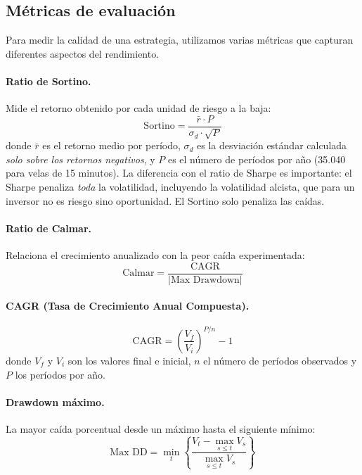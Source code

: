 \documentclass[12pt,a4paper]{article}
\begin{document}
\subsection{Métricas de evaluación}

Para medir la calidad de una estrategia, utilizamos varias métricas que capturan
diferentes aspectos del rendimiento.

\paragraph{Ratio de Sortino.} Mide el retorno obtenido por cada unidad de riesgo a
la baja:
\begin{equation}
\text{Sortino} = \frac{\bar{r} \cdot P}{\sigma_d \cdot \sqrt{P}}
\label{eq:sortino}
\end{equation}
donde $\bar{r}$ es el retorno medio por período, $\sigma_d$ es la desviación estándar
calculada \textit{solo sobre los retornos negativos}, y $P$ es el número de períodos
por año (35.040 para velas de 15 minutos). La diferencia con el ratio de Sharpe
 es importante: el Sharpe penaliza \textit{toda} la
volatilidad, incluyendo la volatilidad alcista, que para un inversor no es riesgo
sino oportunidad. El Sortino solo penaliza las caídas.

\paragraph{Ratio de Calmar.} Relaciona el crecimiento anualizado con la peor caída
experimentada:
\begin{equation}
\text{Calmar} = \frac{\text{CAGR}}{|\text{Max Drawdown}|}
\label{eq:calmar}
\end{equation}

\paragraph{CAGR (Tasa de Crecimiento Anual Compuesta).}
\begin{equation}
\text{CAGR} = \left(\frac{V_f}{V_i}\right)^{P/n} - 1
\label{eq:cagr}
\end{equation}
donde $V_f$ y $V_i$ son los valores final e inicial, $n$ el número de períodos
observados y $P$ los períodos por año.

\paragraph{Drawdown máximo.} La mayor caída porcentual desde un máximo hasta el
siguiente mínimo:
\begin{equation}
\text{Max DD} = \min_t \left\{ \frac{V_t - \max_{s \leq t} V_s}{\max_{s \leq t} V_s} \right\}
\label{eq:maxdd}
\end{equation}
\end{document}
